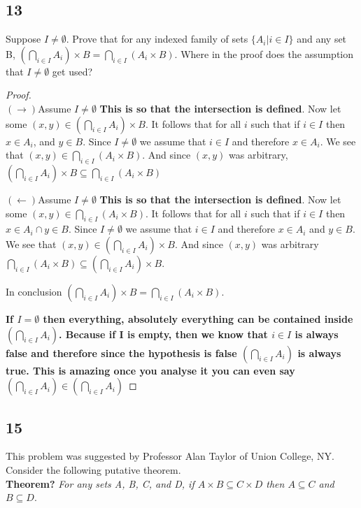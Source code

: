 \documentclass{article}
\begin{document}
\subsection{13}
Suppose $I \neq \emptyset$. Prove that for any indexed family of sets $\{A_i|i \in I \}$ and any set B, $(\bigcap_{i \in I}A_i)\times B = \bigcap_{i \in I}(A_i \times B)$. Where in the proof does the assumption that $I \neq \emptyset$ get used?

\begin{proof}$ $\\

$(\rightarrow)$Assume $I \neq \emptyset$ \textbf{This is so that the intersection is defined}. Now let some $(x,y) \in (\bigcap_{i \in I}A_i)\times B$. It follows that for all $i$ such that if $i \in I$ then $x \in A_i$, and $y \in B$. Since $I \neq \emptyset$ we assume that $i \in I$ and therefore $x \in A_i$. We see that $(x,y) \in \bigcap_{i \in I}(A_i \times B)$. And since $(x,y)$ was arbitrary, $(\bigcap_{i \in I}A_i)\times B \subseteq \bigcap_{i \in I}(A_i \times B)$

$(\leftarrow)$Assume $I \neq \emptyset$ \textbf{This is so that the intersection is defined}. Now let some $(x,y) \in \bigcap_{i \in I}(A_i \times B)$. It follows that for all $i$ such that if $i \in I$ then $x \in A_i \cap y \in B$. Since $I \neq \emptyset$ we assume that $i \in I$ and therefore $x \in A_i$ and $y \in B$. We see that $(x,y) \in (\bigcap_{i \in I}A_i)\times B$. And since $(x,y)$ was arbitrary $\bigcap_{i \in I}(A_i \times B) \subseteq (\bigcap_{i \in I}A_i)\times B$.

In conclusion $(\bigcap_{i \in I}A_i)\times B = \bigcap_{i \in I}(A_i \times B)$.

\textbf{If $I = \emptyset$ then everything, absolutely everything can be contained inside $(\bigcap_{i \in I}A_i)$. Because if I is empty, then we know that $i \in I$ is always false and therefore since the hypothesis is false   $(\bigcap_{i \in I}A_i)$ is always true. This is amazing once you analyse it you can even say $(\bigcap_{i \in I}A_i) \in (\bigcap_{i \in I}A_i)$}
\end{proof}
\newpage
\subsection{15}
This problem was suggested by Professor Alan Taylor of Union College, NY. Consider the following putative theorem.\\

\textbf{Theorem?} \textit{For any sets A, B, C, and D, if $A \times B \subseteq C \times D$ then $A \subseteq C$ and $B \subseteq D$}.\\
\end{document}
